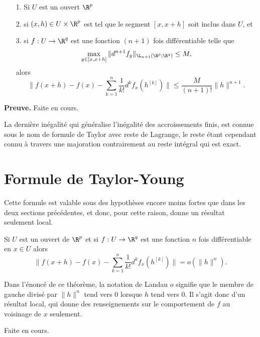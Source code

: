 \documentclass[class=report,crop=false]{standalone}
\begin{document}
\begin{theoreme}
\textcolor[rgb]{0.44,0.00,0.87}{
  \begin{itemize}
  \item[1.] Si $U$ est un ouvert $\R^p$
  \item[2.] si $(x,h) \in U \times \R^p$ est tel que le segment $[x,x+h]$ soit inclus dans $U$, et
  \item[3.] si $f: U \rightarrow \R^q$ est une fonction $(n+1)$ fois diff\'erentiable telle que
  \begin{equation*}
    \displaystyle \max_{y\in[x,x+h]} \|d^{n+1}f_y\|_{\L_{n+1}(\R^p;\R^q)} \leq M,
  \end{equation*}
  alors
  \begin{equation*}
    \|f(x+h)-f(x)- \displaystyle \sum_{k=1}^n \dfrac{1}{k!}d^kf_x(h^{[k]})\| \leq \dfrac{M}{(n+1)!}\|h\|^{n+1}.
  \end{equation*}
\end{itemize}}
\end{theoreme}

{\textbf{Preuve.}} Faite en cours.

\noindent La derni\`ere in\'egalit\'e qui g\'en\'eralise l'in\'egalit\'e des accroissements finis, est connue sous le nom
de formule de Taylor avec reste de Lagrange, le reste \'etant cependant connu \`a travers une majoration
contrairement au reste int\'egral qui est exact.
\section{Formule de Taylor-Young}
\noindent Cette formule est valable sous des hypoth\`eses encore moins fortes que dans les deux sections précédentes, et donc, pour cette raison, donne un r\'esultat seulement local.


\begin{theoreme}
\textcolor[rgb]{0.44,0.00,0.87}{
  Si $U$ est un ouvert de $\R^p$ et si $f: U \rightarrow \R^q$ est
  une fonction $n$ fois diff\'erentiable en $x \in U$ alors
  \begin{equation*}
    \|f(x+h)-f(x)- \displaystyle \sum_{k=1}^n \dfrac{1}{k!} d^kf_x(h^{[k]})\| = o(\|h\|^n).
  \end{equation*}}
\end{theoreme}

\begin{remarque*}
\textcolor[rgb]{0.00,0.00,1.00}{
  Dans l'\'enonc\'e de ce th\'eor\`eme, la notation de Landau $o$ signifie que le membre de gauche divis\'e par $\|h\|^n$
  tend vers $0$ lorsque $h$ tend vers $0$. Il s'agit donc d'un r\'esultat local,
  qui donne des renseignements sur le comportement de $f$ au voisinage de $x$ seulement.}
\end{remarque*}
 Faite en cours.
\end{document}
